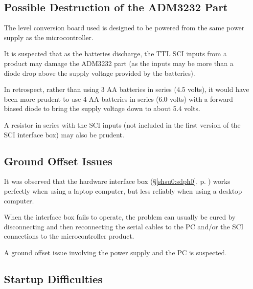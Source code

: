 \documentclass[letterpaper,10pt,titlepage]{article}
\begin{document}
\subsection{Possible Destruction of the ADM3232 Part}
\label{skli0:sdap0}

The level conversion board used is designed to be powered from the same power supply
as the microcontroller.

It is suspected that as the batteries discharge, the TTL 
SCI inputs from a product may
damage the ADM3232 part (as the 
inputs may be more than a diode drop above the
supply voltage provided by the batteries).

In retrospect, rather than using 3 AA 
batteries in series (4.5 volts),
it would have been more prudent to use 
4 AA batteries in series (6.0 volts) 
with a forward-biased diode to bring the supply 
voltage down to about 5.4 volts.

A resistor in series with the SCI inputs 
(not included in the first version
of the SCI interface box) may also be prudent.


\subsection{Ground Offset Issues}
\label{skli0:sgoi0}

It was observed that the hardware interface box
(\S{}\ref{shsu0:sdph0}, p. \pageref{shsu0:sdph0})
works perfectly when using a laptop computer, but 
less reliably when using a desktop computer.

When the interface box fails to operate, the problem can usually
be cured by disconnecting and then reconnecting the serial cables
to the PC and/or the SCI connections to the microcontroller product.

A ground offset issue involving the power supply and the PC 
is suspected.


\subsection{Startup Difficulties}
\label{skli0:ssud0}
\end{document}
